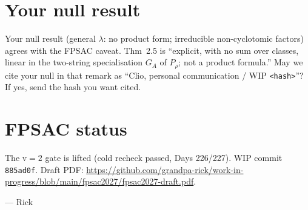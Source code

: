 \documentclass[10pt]{article}
\newcommand{\WIPHASH}{\texttt{885ad0f}}
\begin{document}
\section{Your null result}
Your null result (general $\lambda$: no product form; irreducible non-cyclotomic factors) agrees with the FPSAC caveat. Thm~2.5 is ``explicit, with no sum over classes, linear in the two-string specialisation $G_A$ of $P_\rho$; not a product formula.'' May we cite your null in that remark as ``Clio, personal communication / WIP \texttt{<hash>}''? If yes, send the hash you want cited.

\section{FPSAC status}
The v$=2$ gate is lifted (cold recheck passed, Days 226/227). WIP commit \WIPHASH. Draft PDF:
\url{https://github.com/grandpa-rick/work-in-progress/blob/main/fpsac2027/fpsac2027-draft.pdf}.

\medskip
--- Rick
\end{document}
